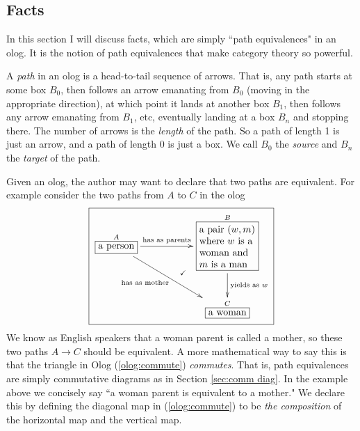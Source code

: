 \documentclass{book}
\def\tn{\textnormal}
\def\to{\rightarrow}
\def\rr{\raggedright}
\newcommand{\LA}[2]{\ar[#1]^-{\tn {#2}}}
\newcommand{\LAL}[2]{\ar[#1]_-{\tn {#2}}}
\newcommand{\obox}[3]{\stackrel{#1}{\fbox{\parbox{#2}{#3}}}}
\newcommand{\smbox}[2]{\stackrel{#1}{\fbox{#2}}}
\theoremstyle{remark}
\theoremstyle{definition}
\begin{document}

\subsection{Facts}\label{sec:facts}

In this section I will discuss facts, which are simply ``path equivalences" in an olog. It is the notion of path equivalences that make category theory so powerful. 

A {\em path} in an olog is a head-to-tail sequence of arrows. That is, any path starts at some box $B_0$, then follows an arrow emanating from $B_0$ (moving in the appropriate direction), at which point it lands at another box $B_1$, then follows any arrow emanating from $B_1$, etc, eventually landing at a box $B_n$ and stopping there. The number of arrows is the {\em length} of the path. So a path of length 1 is just an arrow, and a path of length 0 is just a box. We call $B_0$ the {\em source} and $B_n$ the {\em target} of the path.

Given an olog, the author may want to declare that two paths are equivalent.  For example consider the two paths from $A$ to $C$ in the olog 
\begin{align}\label{olog:commute}\fbox{\xymatrixnocompile{\smbox{A}{a person}\LA{rr}{has as parents}\LAL{drr}{\parbox{.8in}{has as mother}}&&\obox{B}{.8in}{\rr a pair $(w,m)$ where $w$ is a woman and $m$ is a man}\ar@{}[dll]|(.4){\checkmark}\LA{d}{yields as $w$}\\&&\smbox{C}{a woman}}}\end{align}  We know as English speakers that a woman parent is called a mother, so these two paths $A\to C$ should be equivalent.  A more mathematical way to say this is that the triangle in Olog (\ref{olog:commute}) {\em commutes}. That is, path equivalences are simply commutative diagrams as in Section \ref{sec:comm diag}. In the example above we concisely say ``a woman parent is equivalent to a mother."  We declare this by defining the diagonal map in (\ref{olog:commute}) to be {\em the composition} of the horizontal map and the vertical map. 
\end{document}
